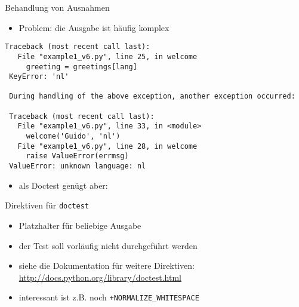 \documentclass[t, utf8x, 10pt]{beamer}
\begin{document}
\begin{frame}[fragile]{Behandlung von Ausnahmen}
 \begin{itemize}
  \item Problem: die Ausgabe ist häufig komplex
 \end{itemize}
 \begin{footnotesize}
  \begin{lstlisting}[language={}]
 Traceback (most recent call last):
   File "example1_v6.py", line 25, in welcome
     greeting = greetings[lang]
 KeyError: 'nl'

 During handling of the above exception, another exception occurred:

 Traceback (most recent call last):
   File "example1_v6.py", line 33, in <module>
     welcome('Guido', 'nl')
   File "example1_v6.py", line 28, in welcome
     raise ValueError(errmsg)
 ValueError: unknown language: nl
  \end{lstlisting}
 \end{footnotesize}
 \begin{itemize}
  \item als Doctest genügt aber:
 \end{itemize}
 \begin{footnotesize}
 
 \end{footnotesize}
\end{frame}


\begin{frame}[fragile]{Direktiven für \texttt{doctest}}
 \begin{itemize}
  \item Platzhalter für beliebige Ausgabe
 \end{itemize}
 \begin{footnotesize}
  
 \end{footnotesize}

 \begin{itemize}
  \item der Test soll vorläufig nicht durchgeführt werden
 \end{itemize}
 \begin{footnotesize}
  
 \end{footnotesize}

 \begin{itemize}
  \item siehe die Dokumentation für weitere Direktiven:
	\url{http://docs.python.org/library/doctest.html}
  \item interessant ist z.B. noch \texttt{+NORMALIZE\_WHITESPACE}
 \end{itemize}
\end{frame}
\end{document}
